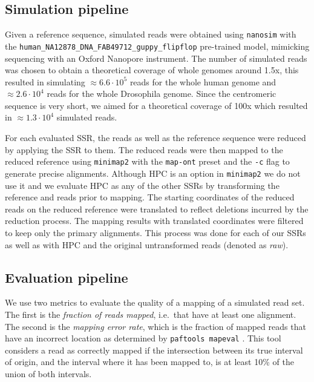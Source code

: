 \documentclass[
  11pt,
  twoside]{scrbook}
\begin{document}
\hypertarget{simulation-pipeline}{%
\subsection{Simulation pipeline}\label{simulation-pipeline}}

Given a reference sequence, simulated reads were obtained using \texttt{nanosim} \autocite{yangNanoSimNanoporeSequence2017} with the \texttt{human\_NA12878\_DNA\_FAB49712\_guppy\_flipflop} pre-trained model, mimicking sequencing with an Oxford Nanopore instrument. The number of simulated reads was chosen to obtain a theoretical coverage of whole genomes around 1.5x, this resulted in simulating \(\approx 6.6\cdot10^5\) reads for the whole human genome and \(\approx 2.6\cdot10^4\) reads for the whole Drosophila genome. Since the centromeric sequence is very short, we aimed for a theoretical coverage of 100x which resulted in \(\approx 1.3\cdot10^4\) simulated reads.

For each evaluated SSR, the reads as well as the reference sequence were reduced by applying the SSR to them. The reduced reads were then mapped to the reduced reference using \texttt{minimap2}\autocite{liMinimap2PairwiseAlignment2018} with the \texttt{map-ont} preset and the \texttt{-c} flag to generate precise alignments. Although HPC is an option in \texttt{minimap2} we do not use it and we evaluate HPC as any of the other SSRs by transforming the reference and reads prior to mapping. The starting coordinates of the reduced reads on the reduced reference were translated to reflect deletions incurred by the reduction process. The mapping results with translated coordinates were filtered to keep only the primary alignments. This process was done for each of our SSRs as well as with HPC and the original untransformed reads (denoted as \emph{raw}).

\hypertarget{evaluation-pipeline}{%
\subsection{Evaluation pipeline}\label{evaluation-pipeline}}

We use two metrics to evaluate the quality of a mapping of a simulated read set. The first is the \emph{fraction of reads mapped}, i.e.~that have at least one alignment. The second is the \emph{mapping error rate}, which is the fraction of mapped reads that have an incorrect location as determined by \texttt{paftools\ mapeval} \autocite{liMinimap2PairwiseAlignment2018}. This tool considers a read as correctly mapped if the intersection between its true interval of origin, and the interval where it has been mapped to, is at least 10\% of the union of both intervals.
\end{document}
